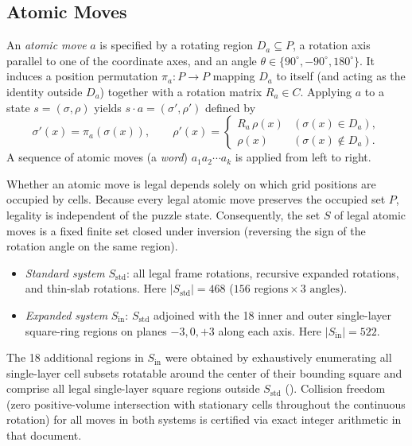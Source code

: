 \documentclass[a4paper,11pt]{article}
\begin{document}
\subsection{Atomic Moves}

An \emph{atomic move} $a$ is specified by a rotating region $D_a\subseteq P$, a rotation axis parallel to one of the coordinate axes, and an angle $\theta\in\{90^\circ,-90^\circ,180^\circ\}$.
It induces a position permutation $\pi_a\colon P\to P$ mapping $D_a$ to itself (and acting as the identity outside $D_a$) together with a rotation matrix $R_a\in C$.
Applying $a$ to a state $s=(\sigma,\rho)$ yields $s\cdot a=(\sigma',\rho')$ defined by
\[
\sigma'(x)=\pi_a(\sigma(x)),\qquad
\rho'(x)=\begin{cases}R_a\,\rho(x)&(\sigma(x)\in D_a),\\ \rho(x)&(\sigma(x)\notin D_a).\end{cases}
\]
A sequence of atomic moves (a \emph{word}) $a_1a_2\cdots a_k$ is applied from left to right.

Whether an atomic move is legal depends solely on which grid positions are occupied by cells.
Because every legal atomic move preserves the occupied set $P$, legality is independent of the puzzle state.
Consequently, the set $S$ of legal atomic moves is a fixed finite set closed under inversion (reversing the sign of the rotation angle on the same region).

\begin{definition}
\begin{itemize}
\item \emph{Standard system} $S_{\mathrm{std}}$: all legal frame rotations, recursive expanded rotations, and thin-slab rotations. Here $|S_{\mathrm{std}}|=468$ ($156\text{ regions}\times 3\text{ angles}$).
\item \emph{Expanded system} $S_{\mathrm{in}}$: $S_{\mathrm{std}}$ adjoined with the 18 inner and outer single-layer square-ring regions on planes $-3,0,+3$ along each axis. Here $|S_{\mathrm{in}}|=522$.
\end{itemize}
\end{definition}

The 18 additional regions in $S_{\mathrm{in}}$ were obtained by exhaustively enumerating all single-layer cell subsets rotatable around the center of their bounding square and comprise all legal single-layer square regions outside $S_{\mathrm{std}}$ ().
Collision freedom (zero positive-volume intersection with stationary cells throughout the continuous rotation) for all moves in both systems is certified via exact integer arithmetic in that document.
\end{document}
